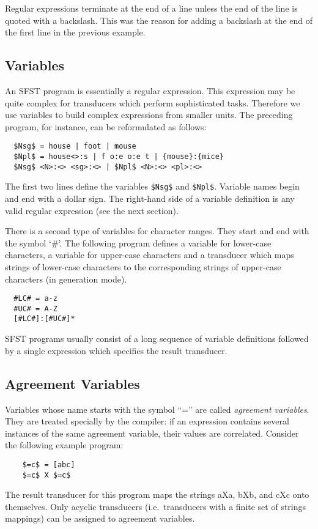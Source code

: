 \documentclass{article}
\begin{document}
Regular expressions terminate at the end of a line unless the end of
the line is quoted with a backslash. This was the reason for adding a
backslash at the end of the first line in the previous example.

\subsection*{Variables}

An SFST program is essentially a regular expression. This expression
may be quite complex for transducers which perform sophisticated
tasks. Therefore we use variables to build complex expressions from
smaller units. The preceding program, for instance, can be
reformulated as follows:

\begin{verbatim}
  $Nsg$ = house | foot | mouse
  $Npl$ = house<>:s | f o:e o:e t | {mouse}:{mice}
  $Nsg$ <N>:<> <sg>:<> | $Npl$ <N>:<> <pl>:<>
\end{verbatim}

The first two lines define the variables \verb#$Nsg$# and
\verb#$Npl$#. Variable names begin and end with a dollar sign. The
right-hand side of a variable definition is any valid regular
expression (see the next section).

There is a second type of variables for character ranges. They start
and end with the symbol `\#'. The following program defines a variable
for lower-case characters, a variable for upper-case characters and a
transducer which maps strings of lower-case characters to the
corresponding strings of upper-case characters (in generation mode).
\begin{verbatim}
  #LC# = a-z
  #UC# = A-Z
  [#LC#]:[#UC#]*
\end{verbatim}

SFST programs usually consist of a long sequence of variable
definitions followed by a single expression which specifies the
result transducer.


\subsection*{Agreement Variables}

Variables whose name starts with the symbol ``='' are called
\emph{agreement variables}. They are treated specially by the
compiler: if an expression contains several instances of the same
agreement variable, their values are correlated. Consider the
following example program:
\begin{verbatim}
    $=c$ = [abc]
    $=c$ X $=c$
\end{verbatim}
The result transducer for this program maps the strings aXa, bXb, and
cXc onto themselves. Only acyclic transducers (i.e.\ transducers with
a finite set of strings mappings) can be assigned to agreement
variables. 
\end{document}
